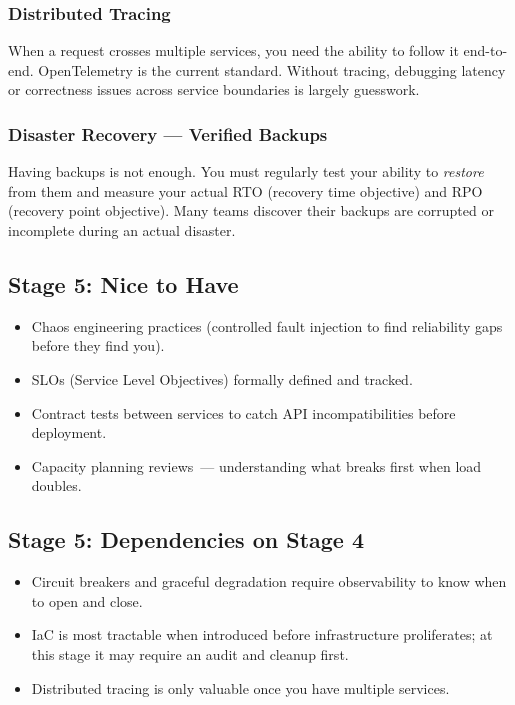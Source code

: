 \subsubsection*{Distributed Tracing}\label{writing-good-code:distributed-tracing}

When a request crosses multiple services, you need the ability to follow it end-to-end. OpenTelemetry is the current standard. Without tracing, debugging latency or correctness issues across service boundaries is largely guesswork.

\subsubsection*{Disaster Recovery --- Verified Backups}\label{writing-good-code:disaster-recovery--verified-backups}

Having backups is not enough. You must regularly test your ability to \emph{restore} from them and measure your actual RTO (recovery time objective) and RPO (recovery point objective). Many teams discover their backups are corrupted or incomplete during an actual disaster.

\subsection*{Stage 5: Nice to Have}\label{writing-good-code:stage-5-nice-to-have}

\begin{itemize}
\tightlist
\item
  Chaos engineering practices (controlled fault injection to find reliability gaps before they find you).
\item
  SLOs (Service Level Objectives) formally defined and tracked.
\item
  Contract tests between services to catch API incompatibilities before deployment.
\item
  Capacity planning reviews~--- understanding what breaks first when load doubles.
\end{itemize}

\subsection*{Stage 5: Dependencies on Stage 4}\label{writing-good-code:stage-5-dependencies-on-stage-4}

\begin{itemize}
\tightlist
\item
  Circuit breakers and graceful degradation require observability to know when to open and close.
\item
  IaC is most tractable when introduced before infrastructure proliferates; at this stage it may require an audit and cleanup first.
\item
  Distributed tracing is only valuable once you have multiple services.
\end{itemize}

